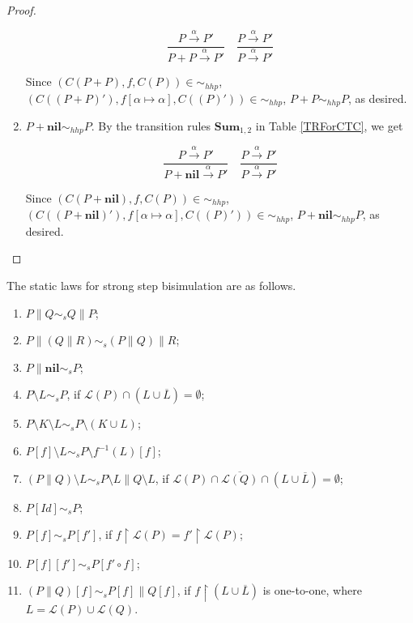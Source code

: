 \begin{proof}
\begin{enumerate}
      $$\frac{P\xrightarrow{\alpha}P'}{P+ P\xrightarrow{\alpha}P'} \quad \frac{P\xrightarrow{\alpha}P'}{P\xrightarrow{\alpha}P'}$$

      Since $(C(P+P),f,C(P))\in\sim_{hhp}$, $(C((P+ P)'),f[\alpha\mapsto \alpha],C((P)'))\in\sim_{hhp}$, $P+ P\sim_{hhp} P$, as desired.
  \item $P+\textbf{nil}\sim_{hhp} P$. By the transition rules $\textbf{Sum}_{1,2}$ in Table \ref{TRForCTC}, we get

      $$\frac{P\xrightarrow{\alpha}P'}{P+ \textbf{nil}\xrightarrow{\alpha}P'} \quad \frac{P\xrightarrow{\alpha}P'}{P\xrightarrow{\alpha}P'}$$

      Since $(C(P+\textbf{nil}),f,C(P))\in\sim_{hhp}$, $(C((P+ \textbf{nil})'),f[\alpha\mapsto \alpha],C((P)'))\in\sim_{hhp}$, $P+ \textbf{nil}\sim_{hhp} P$, as desired.
\end{enumerate}
\end{proof}

\begin{proposition} \label{SLSSB}
The static laws for strong step bisimulation are as follows.
\begin{enumerate}
  \item $P\parallel Q\sim_s Q\parallel P$;
  \item $P\parallel(Q\parallel R)\sim_s (P\parallel Q)\parallel R$;
  \item $P\parallel \textbf{nil}\sim_s P$;
  \item $P\setminus L\sim_s P$, if $\mathcal{L}(P)\cap(L\cup\overline{L})=\emptyset$;
  \item $P\setminus K\setminus L\sim_s P\setminus(K\cup L)$;
  \item $P[f]\setminus L\sim_s P\setminus f^{-1}(L)[f]$;
  \item $(P\parallel Q)\setminus L\sim_s P\setminus L\parallel Q\setminus L$, if $\mathcal{L}(P)\cap\overline{\mathcal{L}(Q)}\cap(L\cup\overline{L})=\emptyset$;
  \item $P[Id]\sim_s P$;
  \item $P[f]\sim_s P[f']$, if $f\upharpoonright\mathcal{L}(P)=f'\upharpoonright\mathcal{L}(P)$;
  \item $P[f][f']\sim_s P[f'\circ f]$;
  \item $(P\parallel Q)[f]\sim_s P[f]\parallel Q[f]$, if $f\upharpoonright(L\cup\overline{L})$ is one-to-one, where $L=\mathcal{L}(P)\cup\mathcal{L}(Q)$.
\end{enumerate}
\end{proposition}

